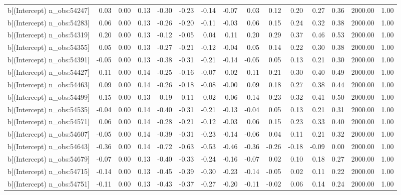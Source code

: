 \begin{table}[ht]
\begin{tabular}{rrrrrrrrrrrrrrr}
  b[(Intercept) n\_obs:54247] & 0.03 & 0.00 & 0.13 & -0.30 & -0.23 & -0.14 & -0.07 & 0.03 & 0.12 & 0.20 & 0.27 & 0.36 & 2000.00 & 1.00 \\ 
  b[(Intercept) n\_obs:54283] & 0.06 & 0.00 & 0.13 & -0.26 & -0.20 & -0.11 & -0.03 & 0.06 & 0.15 & 0.24 & 0.32 & 0.38 & 2000.00 & 1.00 \\ 
  b[(Intercept) n\_obs:54319] & 0.20 & 0.00 & 0.13 & -0.12 & -0.05 & 0.04 & 0.11 & 0.20 & 0.29 & 0.37 & 0.46 & 0.53 & 2000.00 & 1.00 \\ 
  b[(Intercept) n\_obs:54355] & 0.05 & 0.00 & 0.13 & -0.27 & -0.21 & -0.12 & -0.04 & 0.05 & 0.14 & 0.22 & 0.30 & 0.38 & 2000.00 & 1.00 \\ 
  b[(Intercept) n\_obs:54391] & -0.05 & 0.00 & 0.13 & -0.38 & -0.31 & -0.21 & -0.14 & -0.05 & 0.05 & 0.13 & 0.21 & 0.30 & 2000.00 & 1.00 \\ 
  b[(Intercept) n\_obs:54427] & 0.11 & 0.00 & 0.14 & -0.25 & -0.16 & -0.07 & 0.02 & 0.11 & 0.21 & 0.30 & 0.40 & 0.49 & 2000.00 & 1.00 \\ 
  b[(Intercept) n\_obs:54463] & 0.09 & 0.00 & 0.14 & -0.26 & -0.18 & -0.08 & -0.00 & 0.09 & 0.18 & 0.27 & 0.38 & 0.44 & 2000.00 & 1.00 \\ 
  b[(Intercept) n\_obs:54499] & 0.15 & 0.00 & 0.13 & -0.19 & -0.11 & -0.02 & 0.06 & 0.14 & 0.23 & 0.32 & 0.41 & 0.50 & 2000.00 & 1.00 \\ 
  b[(Intercept) n\_obs:54535] & -0.04 & 0.00 & 0.14 & -0.40 & -0.31 & -0.21 & -0.13 & -0.04 & 0.05 & 0.13 & 0.21 & 0.31 & 2000.00 & 1.00 \\ 
  b[(Intercept) n\_obs:54571] & 0.06 & 0.00 & 0.14 & -0.28 & -0.21 & -0.12 & -0.03 & 0.06 & 0.15 & 0.23 & 0.33 & 0.40 & 2000.00 & 1.00 \\ 
  b[(Intercept) n\_obs:54607] & -0.05 & 0.00 & 0.14 & -0.39 & -0.31 & -0.23 & -0.14 & -0.06 & 0.04 & 0.11 & 0.21 & 0.32 & 2000.00 & 1.00 \\ 
  b[(Intercept) n\_obs:54643] & -0.36 & 0.00 & 0.14 & -0.72 & -0.63 & -0.53 & -0.46 & -0.36 & -0.26 & -0.18 & -0.09 & 0.00 & 2000.00 & 1.00 \\ 
  b[(Intercept) n\_obs:54679] & -0.07 & 0.00 & 0.13 & -0.40 & -0.33 & -0.24 & -0.16 & -0.07 & 0.02 & 0.10 & 0.18 & 0.27 & 2000.00 & 1.00 \\ 
  b[(Intercept) n\_obs:54715] & -0.14 & 0.00 & 0.13 & -0.45 & -0.39 & -0.30 & -0.23 & -0.14 & -0.05 & 0.02 & 0.11 & 0.22 & 2000.00 & 1.00 \\ 
  b[(Intercept) n\_obs:54751] & -0.11 & 0.00 & 0.13 & -0.43 & -0.37 & -0.27 & -0.20 & -0.11 & -0.02 & 0.06 & 0.14 & 0.24 & 2000.00 & 1.00 \\ 

\end{tabular}
\end{table}
